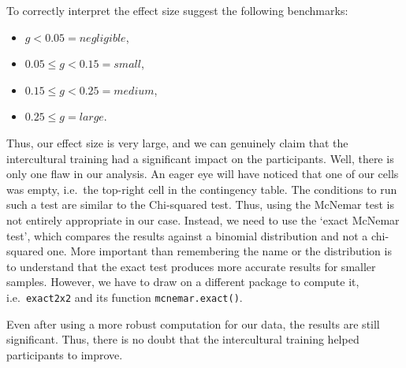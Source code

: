 \documentclass[
]{book}
\newenvironment{Shaded}{\begin{snugshade}}{\end{snugshade}}
\newcommand{\DocumentationTok}[1]{\textcolor[rgb]{0.56,0.35,0.01}{\textbf{\textit{#1}}}}
\newcommand{\FunctionTok}[1]{\textcolor[rgb]{0.00,0.00,0.00}{#1}}
\newcommand{\NormalTok}[1]{#1}
\newcommand{\SpecialCharTok}[1]{\textcolor[rgb]{0.00,0.00,0.00}{#1}}
\begin{document}
To correctly interpret the effect size \citet{cohen1988statistical} suggest the following benchmarks:

\begin{itemize}
\item
  \(g < 0.05 = negligible\),
\item
  \(0.05 \leq g < 0.15 = small\),
\item
  \(0.15 \leq g < 0.25 = medium\),
\item
  \(0.25 \leq g = large\).
\end{itemize}

Thus, our effect size is very large, and we can genuinely claim that the intercultural training had a significant impact on the participants. Well, there is only one flaw in our analysis. An eager eye will have noticed that one of our cells was empty, i.e.~the top-right cell in the contingency table. The conditions to run such a test are similar to the Chi-squared test. Thus, using the McNemar test is not entirely appropriate in our case. Instead, we need to use the `exact McNemar test', which compares the results against a binomial distribution and not a chi-squared one. More important than remembering the name or the distribution is to understand that the exact test produces more accurate results for smaller samples. However, we have to draw on a different package to compute it, i.e.~\texttt{exact2x2} and its function \texttt{mcnemar.exact()}.

\begin{Shaded}
\end{Shaded}

Even after using a more robust computation for our data, the results are still significant. Thus, there is no doubt that the intercultural training helped participants to improve.
\end{document}
